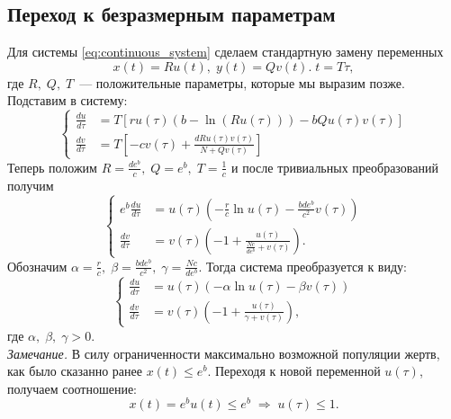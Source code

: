 \subsection{Переход к безразмерным параметрам}

Для системы \ref{eq:continuous_system} сделаем стандартную замену переменных
$$
        x(t) = R u(t),\;
        y(t) = Q v(t).\;
        t    = T\tau,
$$
где $R,\; Q,\; T$~--- положительные параметры, которые мы выразим позже. Подставим в систему:
$$
        \left\{
        \begin{aligned}
                \frac{du}{d\tau} &= T \left[ r u(\tau) \left( b - \ln(Ru(\tau))\right) - bQu(\tau)v(\tau)\right] \\
                \frac{dv}{d\tau} &= T \left[ -cv(\tau) + \frac{dRu(\tau)v(\tau)}{N + Qv(\tau)} \right]
        \end{aligned}
        \right.
$$
Теперь положим $R = \frac{d e^b}{c},\; Q = e^b,\; T = \frac{1}{c}$ и после тривиальных преобразований получим
$$
        \left\{
        \begin{aligned}
                e^b\frac{du}{d\tau} &= u(\tau)\left(-\frac{r}{c}\ln u(\tau) - \frac{bde^b}{c^2}v(\tau)\right) \\
                \frac{dv}{d\tau} &= v(\tau)\left( -1 + \frac{u(\tau)}{\frac{Nc}{de^b} + v(\tau)}\right).
        \end{aligned}
        \right.
$$
Обозначим $\alpha = \frac{r}{c},\; \beta = \frac{bde^b}{c^2},\; \gamma = \frac{Nc}{de^b}$. Тогда система преобразуется к виду:
\begin{equation} \label{eq:short_continuous_system}
        \left\{
        \begin{aligned}
                \frac{du}{d\tau} &= u(\tau)\left( -\alpha\ln u(\tau) - \beta v(\tau) \right) \\
                \frac{dv}{d\tau} &= v(\tau)\left( -1 + \frac{u(\tau)}{\gamma + v(\tau)}\right),
        \end{aligned}
        \right.
\end{equation}
где $\alpha,\; \beta,\; \gamma > 0$.\\
\textit{Замечание.} В силу ограниченности максимально возможной популяции жертв, как было сказанно ранее $x(t) \leqslant e^b$. Переходя к новой переменной $u(\tau)$, получаем соотношение:
$$
        x(t) = e^b u(t) \leqslant e^b \;\Longrightarrow\; u(\tau) \leqslant 1.
$$